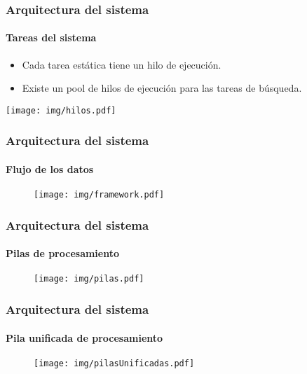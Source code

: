 \documentclass[11pt,a4paper,spanish]{beamer}
\begin{document}
\begin{frame}

\frametitle{Arquitectura del sistema}

\framesubtitle{Tareas del sistema}

\begin{itemize}

	\item Cada tarea estática tiene un hilo de ejecución.

	\item Existe un pool de hilos de ejecución para las tareas de búsqueda.

\end{itemize}

\texttt{[image: img/hilos.pdf]}

\end{frame}

\begin{frame}

\frametitle{Arquitectura del sistema}

\framesubtitle{Flujo de los datos}

\begin{figure}[h]

	\centering

	\texttt{[image: img/framework.pdf]}

\end{figure}

\end{frame}

\begin{frame}

\frametitle{Arquitectura del sistema}

\framesubtitle{Pilas de procesamiento}

\begin{figure}[h]

	\centering

	\texttt{[image: img/pilas.pdf]}

\end{figure}

\end{frame}

\begin{frame}

\frametitle{Arquitectura del sistema}

\framesubtitle{Pila unificada de procesamiento}

\begin{figure}[h]

	\centering

	\texttt{[image: img/pilasUnificadas.pdf]}

\end{figure}

\end{frame}
\end{document}
